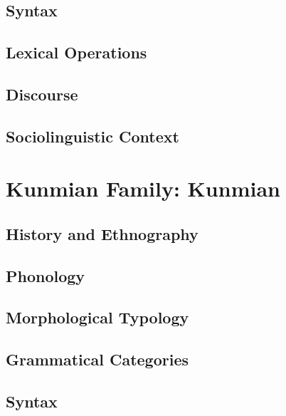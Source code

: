 \documentclass[12pt,letterpaper,openany,twoside]{memoir}
\let\originalpart=\part
\def\part{\cleardoublepage\originalpart}
\begin{document}
\chapter{Syntax}

\chapter{Lexical Operations}

\chapter{Discourse}

\chapter{Sociolinguistic Context}

\part{Kunmian Family: Kunmian}

\chapter{History and Ethnography}

\chapter{Phonology}

\chapter{Morphological Typology}

\chapter{Grammatical Categories}

\chapter{Syntax}
\end{document}
